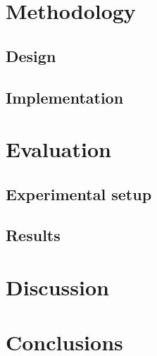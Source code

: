 \documentclass[12pt,english]{article}
\begin{document}
\section{Methodology}

\subsection{Design}

\subsection{Implementation}


\section{Evaluation}

\subsection{Experimental setup}

\subsection{Results}


\section{Discussion}

\section{Conclusions}


\newpage


\end{document}
